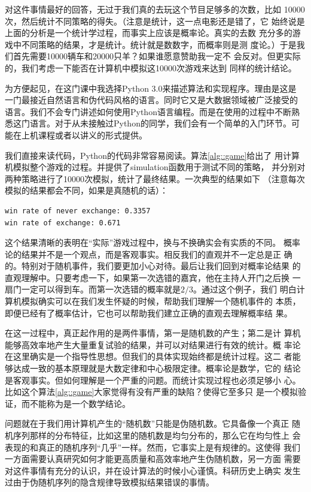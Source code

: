 对这件事情最好的回答，无过于我们真的去玩这个节目足够多的次数，比如
10000次，然后统计不同策略的得失。（注意是统计，这一点电影还是错了，它
  始终说是上面的分析是一个统计学过程，而事实上应该是概率论。真实的去数
  充分多的游戏中不同策略的结果，才是统计。统计就是数数字，而概率则是测
  度论。）于是我们首先需要10000辆车和20000只羊？如果谁愿意赞助我一定不
会反对。但更实际的，我们考虑一下能否在计算机中模拟这10000次游戏来达到
同样的统计结论。

为方便起见，在这门课中我选择Python 3.0来描述算法和实现程序。理由是这是
一门最接近自然语言和伪代码风格的语言。同时它又是大数据领域被广泛接受的
语言。我们不会专门讲述如何使用Python语言编程。而是在使用的过程中不断熟
悉这门语言。对于从未接触过Python的同学，我们会有一个简单的入门环节。可
能在上机课程或者以讲义的形式提供。

我们直接来读代码，Python的代码非常容易阅读。算法\ref{alg::game}给出了
用计算机模拟整个游戏的过程。并提供了simulation函数用于测试不同的策略，
并分别对两种策略进行了10000次模拟，统计了最终结果。一次典型的结果如下
（注意每次模拟的结果都会不同，如果是真随机的话）：

\begin{lstlisting}
win rate of never exchange: 0.3357
win rate of exchange: 0.671
\end{lstlisting}

这个结果清晰的表明在``实际''游戏过程中，换与不换确实会有实质的不同。
概率论的结果并不是一个观点，而是客观事实。相反我们的直观并不一定总是正
确的。特别对于随机事件，我们要更加小心对待。最后让我们回到对概率论结果
的直观理解中。只要考虑一下，如果第一次选错的嘉宾，他在主持人开门之后换
一扇门一定可以得到车。而第一次选错的概率就是$2/3$。通过这个例子，我们
明白计算机模拟确实可以在我们发生怀疑的时候，帮助我们理解一个随机事件的
本质，即便已经有了概率估计，它也可以帮助我们建立正确的直观去理解概率结
果。

在这一过程中，真正起作用的是两件事情，第一是随机数的产生；第二是计
算机能够高效率地产生大量重复试验的结果，并可以对结果进行有效的统计。概
率论在这里确实是一个指导性思想。但我们的具体实现始终都是统计过程。这二
者能够达成一致的基本原理就是大数定律和中心极限定律。概率论是数学，它的
结论是客观事实。但如何理解是一个严重的问题。而统计实现过程也必须足够小
心。比如这个算法\ref{alg::game}大家觉得有没有严重的缺陷？使得它至多只
是一个模拟验证，而不能称为是一个数学结论。

问题就在于我们用计算机产生的``随机数''只能是伪随机数。它具备像一个真正
随机序列那样的分布特征，比如这里的随机数是均匀分布的，那么它在均匀性上
会表现的和真正的随机序列``几乎''一样。然而，它事实上是有规律的。这使得
我们一方面需要认真研究如何才能更高质量和高效率地产生伪随机数，另一方面
需要对这件事情有充分的认识，并在设计算法的时候小心谨慎。科研历史上确实
发生过由于伪随机序列的隐含规律导致模拟结果错误的事情。

